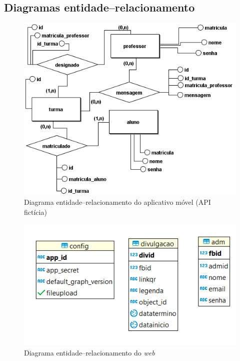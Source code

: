 \subsection{Diagramas entidade--relacionamento}
\begin{figure}[H]
    \centering
    \includegraphics[width=\textwidth]{figuras/entidaderelacionamentomobile}
    \caption{Diagrama entidade--relacionamento do aplicativo móvel (API fictícia)}
\end{figure}

\begin{figure}[H]
    \centering
    \includegraphics[width=\textwidth]{figuras/entidaderelacionamento}
    \caption{Diagrama entidade--relacionamento do \textit{web}}
\end{figure}

